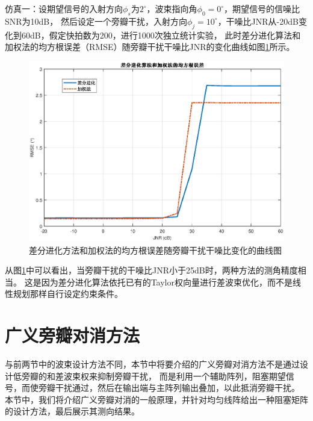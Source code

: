 \documentclass[master]{thesis-uestc}
\begin{document}
仿真一：设期望信号的入射方向$\phi_s$为$2^\circ$，波束指向角$\phi_0=0^\circ$，期望信号的信噪比SNR为10dB，
然后设定一个旁瓣干扰，入射方向$\phi_j=10^\circ$，干噪比JNR从-20dB变化到60dB，假定快拍数为200，进行1000次独立统计实验，
此时差分进化算法和加权法的均方根误差（RMSE）随旁瓣干扰干噪比JNR的变化曲线如图\ref{DR_RMSE_JNR}所示。
\begin{figure}[H]
    \includegraphics[scale=0.5]{pic/DE_RMSE_JNR.eps}
    \caption{差分进化方法和加权法的均方根误差随旁瓣干扰干噪比变化的曲线图}
    \label{DR_RMSE_JNR}
\end{figure}

从图\ref{DR_RMSE_JNR}中可以看出，当旁瓣干扰的干噪比JNR小于25dB时，两种方法的测角精度相当。
这是因为差分进化算法依托已有的Taylor权向量进行差波束优化，而不是线性规划那样自行设定约束条件。

\section{广义旁瓣对消方法}
与前两节中的波束设计方法不同，本节中将要介绍的广义旁瓣对消方法不是通过设计低旁瓣的和差波束权来抑制旁瓣干扰，
而是利用一个辅助阵列，阻塞期望信号，而使旁瓣干扰通过，然后在输出端与主阵列输出叠加，以此抵消旁瓣干扰。
本节中，我们将介绍广义旁瓣对消的一般原理，并针对均匀线阵给出一种阻塞矩阵的设计方法，最后展示其测向结果。
\end{document}
